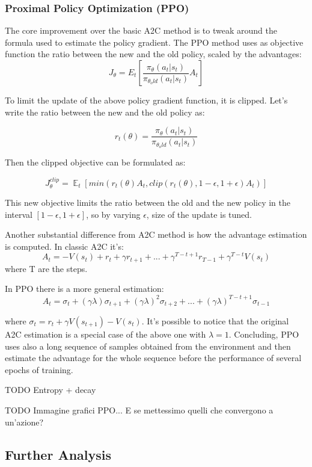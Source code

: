 \documentclass[12pt]{article}
\DeclareMathOperator{\EX}{\mathbb{E}}%
\begin{document}
\subsubsection{Proximal Policy Optimization (PPO)}
The core improvement over the basic A2C method is to tweak around the formula used to estimate the policy gradient. The PPO method \cite{ppo} uses as objective function the ratio between the new and the old policy, scaled by the advantages:
\[ J_\theta = E_t[\frac{\pi_\theta(a_t | s_t)}{\pi_{\theta_old}(a_t | s_t)} A_t] \]

To limit the update of the above policy gradient function, it is clipped.
Let's write the ratio between the new and the old policy as:

\[ r_t(\theta) = \frac{\pi_\theta(a_t | s_t)}{\pi_{\theta_old}(a_t | s_t)}\]

Then the clipped objective can be formulated as:

\[J_\theta^{clip} = \EX_t[min(r_t(\theta)A_t, clip(r_t(\theta), 1-\epsilon, 1+\epsilon)A_t)]\]

This new objective limits the ratio between the old and the new policy in the interval $[1-\epsilon, 1+\epsilon]$, so by varying $\epsilon$, size of the update is tuned.

Another substantial difference from A2C method is how the advantage estimation is computed. In classic A2C it's:
\[ A_t = -V(s_t) + r_t + \gamma r_{t+1} + ... + \gamma^{T - t +1} r_{T-1} + \gamma^{T - t}V(s_t)\]
where T are the steps.

In PPO there is a more general estimation:
\[ A_t = \sigma_t + (\gamma \lambda)\sigma_{t+1} + (\gamma \lambda)^2 \sigma_{t+2} + ... + (\gamma \lambda)^{T-t+1}\sigma_{t-1}\]

where $\sigma_t = r_t + \gamma V(s_{t+1})- V(s_t)$. It's possible to notice that the original A2C estimation is a special case of the above one with $\lambda=1$.
Concluding, PPO uses also a long sequence of samples obtained from the environment and then estimate the advantage for the whole sequence before the performance of several epochs of training.

TODO Entropy + decay

TODO Immagine grafici PPO... E se mettessimo quelli che convergono a un'azione?

\subsection{Further Analysis}
\end{document}
